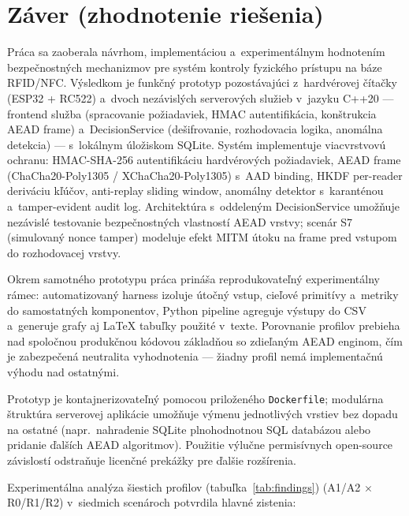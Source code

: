 \section{Záver (zhodnotenie riešenia)}
\label{sec:conclusion}

Práca sa zaoberala návrhom, implementáciou a~experimentálnym hodnotením bezpečnostných mechanizmov pre systém kontroly fyzického prístupu na báze RFID/NFC. Výsledkom je funkčný prototyp pozostávajúci z~hardvérovej čítačky (ESP32 + RC522) a~dvoch nezávislých serverových služieb v~jazyku C++20 --- frontend služba (spracovanie požiadaviek, HMAC autentifikácia, konštrukcia AEAD frame) a~DecisionService (dešifrovanie, rozhodovacia logika, anomálna detekcia) --- s~lokálnym úložiskom SQLite. Systém implementuje viacvrstvovú ochranu: HMAC-SHA-256 autentifikáciu hardvérových požiadaviek, AEAD frame (ChaCha20-Poly1305 / XChaCha20-Poly1305) s~AAD binding, HKDF per-reader deriváciu kľúčov, anti-replay sliding window, anomálny detektor s~karanténou a~tamper-evident audit log. Architektúra s~oddeleným DecisionService umožňuje nezávislé testovanie bezpečnostných vlastností AEAD vrstvy; scenár S7 (simulovaný nonce tamper) modeluje efekt MITM útoku na frame pred vstupom do rozhodovacej vrstvy.

Okrem samotného prototypu práca prináša reprodukovateľný experimentálny rámec: automatizovaný harness izoluje útočný vstup, cieľové primitívy a~metriky do samostatných komponentov, Python pipeline agreguje výstupy do CSV a~generuje grafy aj LaTeX tabuľky použité v~texte. Porovnanie profilov prebieha nad spoločnou produkčnou kódovou základňou so zdieľaným AEAD enginom, čím je zabezpečená neutralita vyhodnotenia --- žiadny profil nemá implementačnú výhodu nad ostatnými.

Prototyp je kontajnerizovateľný pomocou priloženého \texttt{Dockerfile}; modulárna štruktúra serverovej aplikácie umožňuje výmenu jednotlivých vrstiev bez dopadu na ostatné (napr.\ nahradenie SQLite plnohodnotnou SQL databázou alebo pridanie ďalších AEAD algoritmov). Použitie výlučne permisívnych open-source závislostí odstraňuje licenčné prekážky pre ďalšie rozšírenia.

Experimentálna analýza šiestich profilov (tabuľka~\ref{tab:findings}) (A1/A2 $\times$ R0/R1/R2) v~siedmich scenároch potvrdila hlavné zistenia:

